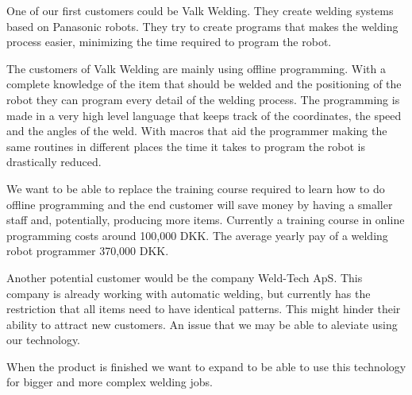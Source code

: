 One of our first customers could be Valk Welding. They create welding systems based on Panasonic robots. They try to create programs that makes the welding process easier, minimizing the time required to program the robot.

The customers of Valk Welding are mainly using offline programming.
With a complete knowledge of the item that should be welded and the positioning of the robot they can program every detail of the welding process.
The programming is made in a very high level language that keeps track of the coordinates, the speed and the angles of the weld.
With macros that aid the programmer making the same routines in different places the time it takes to program the robot is drastically reduced.

We want to be able to replace the training course required to learn how to do offline programming and the end customer will save money by having a smaller staff and, potentially, producing more items. 
Currently a training course in online programming costs around 100,000 DKK\cite{valk_welding_summary}. 
The average yearly pay of a welding robot programmer 370,000 DKK\cite{welding_salary}. 

Another potential customer would be the company Weld-Tech ApS. 
This company is already working with automatic welding, but currently has the restriction that all items need to have identical patterns. 
This might hinder their ability to attract new customers. An issue that we may be able to aleviate using our technology.

When the product is finished we want to expand to be able to use this technology for bigger and more complex welding jobs.

